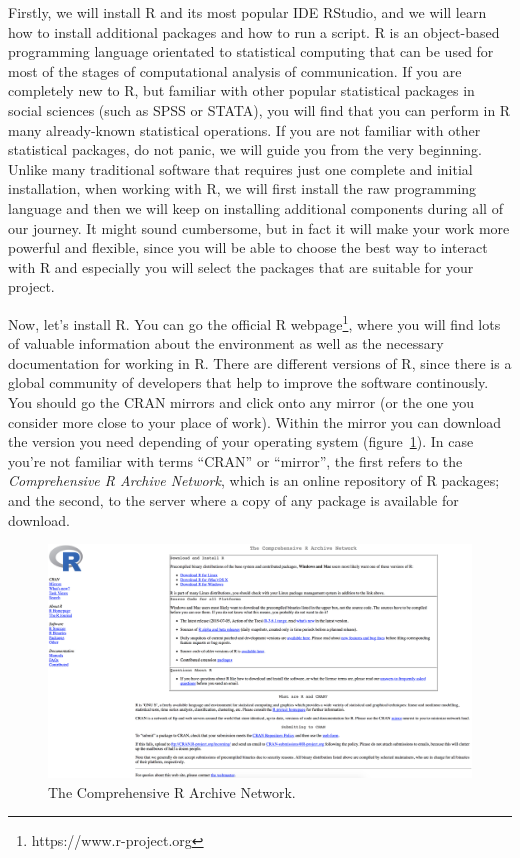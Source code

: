 Firstly, we will install R and its most popular IDE RStudio, and we
will learn how to install additional packages and how to run a
script. R is an object-based programming language
orientated to statistical computing that can be used for most of the
stages of computational analysis of communication.  If you are
completely new to R, but familiar with other popular
statistical packages in social sciences (such as SPSS or STATA), you
will find that you can perform in R many already-known statistical
operations. If you are not familiar with other statistical packages,
do not panic, we will guide you from the very beginning. Unlike
many traditional software that requires just one complete and initial
installation, when working with R, we will first install the raw
programming language and then we will keep on installing additional
components during all of our journey. It might sound cumbersome, but
in fact it will make your work more powerful and flexible, since you
will be able to choose the best way to interact with R and especially
you will select the packages that are suitable for your project.

Now, let's install R. You can go the official R
webpage\footnote{https://www.r-project.org}, where you will find lots
of valuable information about the environment as well as the necessary
documentation for working in R.  There are different versions of R,
since there is a global community of developers that help to improve
the software continously. You should go the CRAN mirrors and click onto
any mirror (or the one you consider more close to your place of
work). Within the mirror you can download the version you need
depending of your operating system (figure~\ref{fig:cran}). In case
you're not familiar with terms ``CRAN'' or ``mirror'', the first
refers to the \textit{Comprehensive R Archive Network}, which is an
online repository of R packages; and the second, to the server where a
copy of any package is available for download.



\begin{figure}
\centering
\includegraphics[width=0.9\linewidth]{figures/ch3_cran}
\caption{The Comprehensive R Archive Network.}
\label{fig:cran}
\end{figure}

